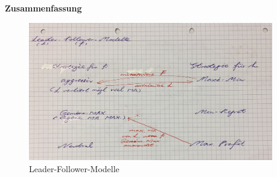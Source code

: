         \textbf{Zusammenfassung}

        \begin{figure}[htbp]
          \centering
          \includegraphics[width=0.95\textwidth]{Images/Leader_Follower_Modelle.JPG}
          \caption{Leader-Follower-Modelle}
          \label{fig:Leader-Follower-Modelle}
        \end{figure}

        \begin{exmp}
         \color{blue}{Aufgabe 6}
       \end{exmp} 
      


    
  




    

